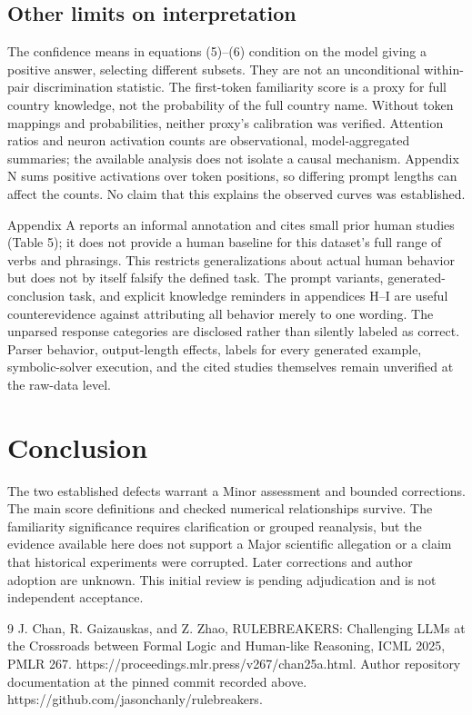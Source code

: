 \documentclass[10pt]{article}
\begin{document}
\subsection*{Other limits on interpretation}
The confidence means in equations (5)–(6) condition on the model giving a positive answer, selecting different subsets. They are not an unconditional within-pair discrimination statistic. The first-token familiarity score is a proxy for full country knowledge, not the probability of the full country name. Without token mappings and probabilities, neither proxy’s calibration was verified. Attention ratios and neuron activation counts are observational, model-aggregated summaries; the available analysis does not isolate a causal mechanism. Appendix N sums positive activations over token positions, so differing prompt lengths can affect the counts. No claim that this explains the observed curves was established.\par
Appendix A reports an informal annotation and cites small prior human studies (Table 5); it does not provide a human baseline for this dataset’s full range of verbs and phrasings. This restricts generalizations about actual human behavior but does not by itself falsify the defined task. The prompt variants, generated-conclusion task, and explicit knowledge reminders in appendices H–I are useful counterevidence against attributing all behavior merely to one wording. The unparsed response categories are disclosed rather than silently labeled as correct. Parser behavior, output-length effects, labels for every generated example, symbolic-solver execution, and the cited studies themselves remain unverified at the raw-data level.\par
\section*{Conclusion}
The two established defects warrant a Minor assessment and bounded corrections. The main score definitions and checked numerical relationships survive. The familiarity significance requires clarification or grouped reanalysis, but the evidence available here does not support a Major scientific allegation or a claim that historical experiments were corrupted. Later corrections and author adoption are unknown. This initial review is pending adjudication and is not independent acceptance.\par
9 J. Chan, R. Gaizauskas, and Z. Zhao, RULEBREAKERS: Challenging LLMs at the Crossroads between Formal Logic and Human-like Reasoning, ICML 2025, PMLR 267. https://proceedings.mlr.press/v267/chan25a.html. Author repository documentation at the pinned commit recorded above. https://github.com/jasonchanly/rulebreakers.\par
\end{document}
